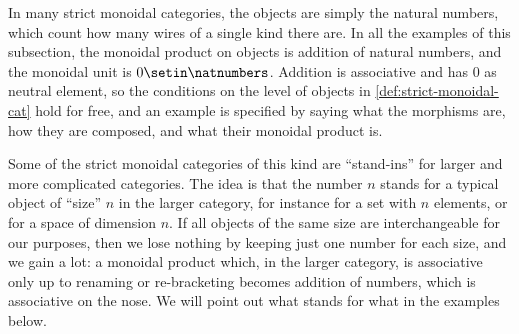 In many strict monoidal categories, the objects are simply the natural numbers, which count how many wires of a single kind there are.
In all the examples of this subsection, the monoidal product on objects is addition of natural numbers, and the monoidal unit is $0 \setin \natnumbers$.
Addition is associative and has $0$ as neutral element, so the conditions on the level of objects in \cref{def:strict-monoidal-cat} hold for free, and an example is specified by saying what the morphisms are, how they are composed, and what their monoidal product is.

Some of the strict monoidal categories of this kind are ``stand-ins'' for larger and more complicated categories.
The idea is that the number $n$ stands for a typical object of ``size'' $n$ in the larger category, for instance for a set with $n$ elements, or for a space of dimension $n$.
If all objects of the same size are interchangeable for our purposes, then we lose nothing by keeping just one number for each size, and we gain a lot: a monoidal product which, in the larger category, is associative only up to renaming or re-bracketing becomes addition of numbers, which is associative on the nose.
We will point out what stands for what in the examples below.

